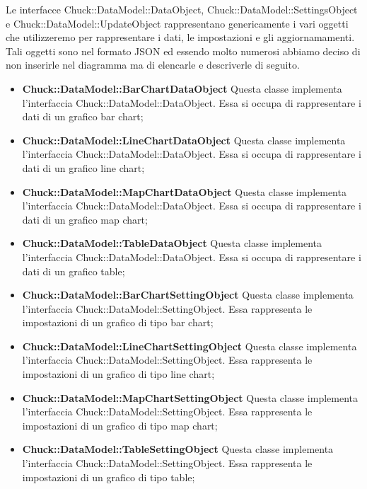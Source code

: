 	Le interfacce Chuck::DataModel::DataObject, Chuck::DataModel::SettingsObject e Chuck::DataModel::UpdateObject rappresentano genericamente i vari oggetti che utilizzeremo per rappresentare i dati, le impostazioni e gli aggiornamamenti. Tali oggetti sono nel formato JSON ed essendo molto numerosi abbiamo deciso di non inserirle nel diagramma ma di elencarle e descriverle di seguito.

	\begin{itemize}
		\item \textbf{Chuck::DataModel::BarChartDataObject} Questa classe implementa l'interfaccia Chuck::DataModel::DataObject. Essa si occupa di rappresentare i dati di un grafico bar chart;

		\item \textbf{Chuck::DataModel::LineChartDataObject} Questa classe implementa l'interfaccia Chuck::DataModel::DataObject. Essa si occupa di rappresentare i dati di un grafico line chart;

		\item \textbf{Chuck::DataModel::MapChartDataObject} Questa classe implementa l'interfaccia Chuck::DataModel::DataObject. Essa si occupa di rappresentare i dati di un grafico map chart;

		\item \textbf{Chuck::DataModel::TableDataObject} Questa classe implementa l'interfaccia Chuck::DataModel::DataObject. Essa si occupa di rappresentare i dati di un grafico table;

		\item \textbf{Chuck::DataModel::BarChartSettingObject} Questa classe implementa l'interfaccia Chuck::DataModel::SettingObject. Essa rappresenta le impostazioni di un grafico di tipo bar chart;

		\item \textbf{Chuck::DataModel::LineChartSettingObject} Questa classe implementa l'interfaccia Chuck::DataModel::SettingObject. Essa rappresenta le impostazioni di un grafico di tipo line chart;

		\item \textbf{Chuck::DataModel::MapChartSettingObject} Questa classe implementa l'interfaccia Chuck::DataModel::SettingObject. Essa rappresenta le impostazioni di un grafico di tipo map chart;

		\item \textbf{Chuck::DataModel::TableSettingObject} Questa classe implementa l'interfaccia Chuck::DataModel::SettingObject. Essa rappresenta le impostazioni di un grafico di tipo table;


\end{itemize}
